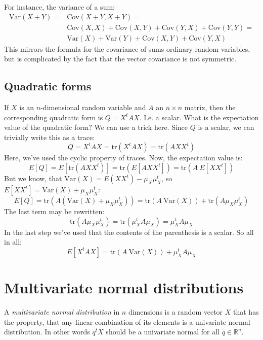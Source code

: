 \documentclass[12pt, a4paper]{article}
\numberwithin{equation}{section}
\begin{document}
For instance, the variance of a sum:
\begin{align}
\textrm{Var}(X+Y)=&\textrm{Cov}(X+Y,X+Y)=\\
&\textrm{Cov}(X,X)+\textrm{Cov}(X,Y)+\textrm{Cov}(Y,X)+\textrm{Cov}(Y,Y)=\\
&\textrm{Var}(X)+\textrm{Var}(Y)+\textrm{Cov}(X,Y)+\textrm{Cov}(Y,X)
\end{align}
This mirrors the formula for the covariance of sums ordinary random variables, but is complicated by the fact that the vector covariance is not symmetric.

\subsection{Quadratic forms}
If $X$ is an $n$-dimensional random variable and $A$ an $n\times n$ matrix, then the corresponding quadratic form is $Q=X^tAX$. I.e. a scalar. What is the expectation value of the quadratic form? We can use a trick here. Since $Q$ is a scalar, we can trivially write this as a trace:
\begin{equation}
Q=X^tAX=\textrm{tr}(X^tAX)=\textrm{tr}(AXX^t)
\end{equation}
Here, we've used the cyclic property of traces. Now, the expectation value is:
\begin{equation}
E[Q]=E[\textrm{tr}(AXX^t)]=\textrm{tr}(E[AXX^t])=\textrm{tr}(A\ E[XX^t])
\end{equation}
But we know, that $\textrm{Var}(X)=E(XX^t)-\mu_X\mu_X^t$, so $E[XX^t]=\textrm{Var}(X)+\mu_X\mu_X^t$:
\begin{equation}
E[Q]=\textrm{tr}(A(\textrm{Var}(X)+\mu_X\mu_X^t))=\textrm{tr}(A\ \textrm{Var}(X))+\textrm{tr}(A\mu_X\mu_X^t)
\end{equation}
The last term may be rewritten:
\begin{equation}
\textrm{tr}(A\mu_X\mu_X^t)=\textrm{tr}(\mu_X^t A\mu_X)=\mu_X^t A\mu_X
\end{equation}
In the last step we've used that the contents of the parenthesis is a scalar. So all in all:
\begin{equation}
E[X^tAX]=\textrm{tr}(A\ \textrm{Var}(X))+\mu_X^t A\mu_X
\end{equation}

\section{Multivariate normal distributions}
A \textit{multivariate normal distribution} in $n$ dimensions is a random vector $X$ that has the property, that any linear combination of its elements is a univariate normal distribution. In other words $q^t X$ should be a univariate normal for all $q\in\mathbb{R}^n$.
\end{document}
